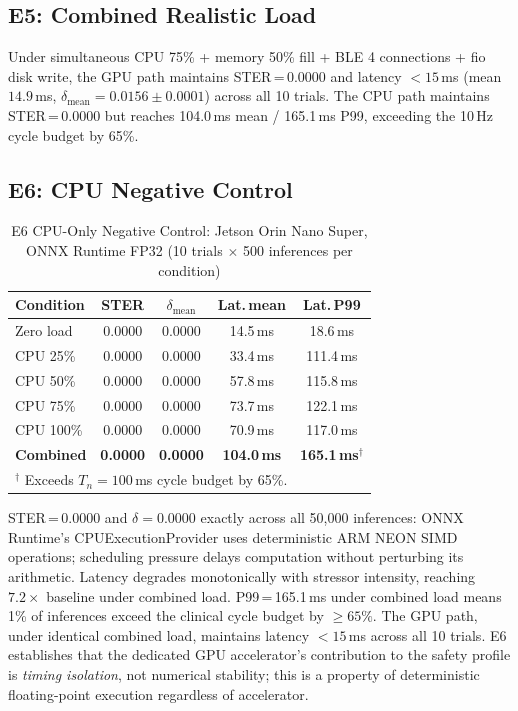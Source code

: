 \documentclass[journal,10pt,twocolumn]{IEEEtran}
\begin{document}
\subsection{E5: Combined Realistic Load}

Under simultaneous CPU 75\% + memory 50\% fill + BLE 4 connections
+ fio disk write, the GPU path maintains STER\,=\,0.0000 and latency
${<}15$\,ms (mean $14.9$\,ms, $\delta_\text{mean}{=}0.0156\pm0.0001$)
across all 10 trials.
The CPU path maintains STER\,=\,0.0000 but reaches 104.0\,ms mean /
165.1\,ms P99, exceeding the 10\,Hz cycle budget by 65\%.

\subsection{E6: CPU Negative Control}

\begin{table}[!t]
\caption{E6 CPU-Only Negative Control: Jetson Orin Nano Super,
  ONNX Runtime FP32 (10 trials $\times$ 500 inferences per condition)}
\label{tab:e6}
\centering
\small
\begin{tabular}{lcccc}
\toprule
\textbf{Condition} & \textbf{STER} & \boldmath$\delta_\text{mean}$ & \textbf{Lat.\,mean} & \textbf{Lat.\,P99} \\
\midrule
Zero load    & 0.0000 & 0.0000 & 14.5\,ms & 18.6\,ms \\
CPU 25\%     & 0.0000 & 0.0000 & 33.4\,ms & 111.4\,ms \\
CPU 50\%     & 0.0000 & 0.0000 & 57.8\,ms & 115.8\,ms \\
CPU 75\%     & 0.0000 & 0.0000 & 73.7\,ms & 122.1\,ms \\
CPU 100\%    & 0.0000 & 0.0000 & 70.9\,ms & 117.0\,ms \\
\textbf{Combined} & \textbf{0.0000} & \textbf{0.0000} & \textbf{104.0\,ms} & \textbf{165.1\,ms}$^\dagger$ \\
\bottomrule
\multicolumn{5}{l}{$^\dagger$ Exceeds $T_n{=}100$\,ms cycle budget by 65\%.}
\end{tabular}
\end{table}

STER\,=\,0.0000 and $\delta{=}0.0000$ exactly across all 50,000
inferences: ONNX Runtime's CPUExecutionProvider uses deterministic
ARM NEON SIMD operations; scheduling pressure delays computation
without perturbing its arithmetic.
Latency degrades monotonically with stressor intensity, reaching
$7.2{\times}$ baseline under combined load.
P99\,=\,165.1\,ms under combined load means 1\% of inferences
exceed the clinical cycle budget by ${\geq}65\%$.
The GPU path, under identical combined load, maintains latency
${<}15$\,ms across all 10 trials.
E6 establishes that the dedicated GPU accelerator's contribution to
the safety profile is \emph{timing isolation}, not numerical stability; this is a property of deterministic floating-point execution regardless of accelerator.
\end{document}

